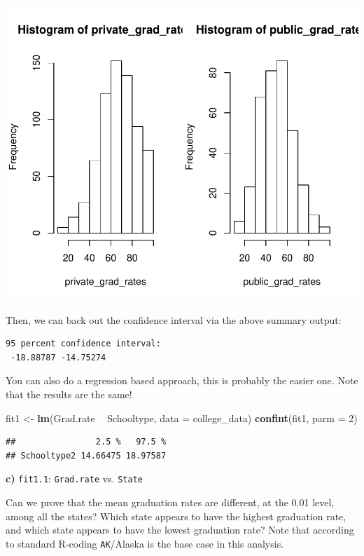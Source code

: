 \documentclass[]{article}
\newenvironment{Shaded}{\begin{snugshade}}{\end{snugshade}}
\newcommand{\KeywordTok}[1]{\textcolor[rgb]{0.13,0.29,0.53}{\textbf{#1}}}
\newcommand{\DataTypeTok}[1]{\textcolor[rgb]{0.13,0.29,0.53}{#1}}
\newcommand{\DecValTok}[1]{\textcolor[rgb]{0.00,0.00,0.81}{#1}}
\newcommand{\StringTok}[1]{\textcolor[rgb]{0.31,0.60,0.02}{#1}}
\newcommand{\OperatorTok}[1]{\textcolor[rgb]{0.81,0.36,0.00}{\textbf{#1}}}
\newcommand{\NormalTok}[1]{#1}
\begin{document}
\begin{flushleft}\includegraphics{Midterm_11_01_2016_Answers_files/figure-latex/unnamed-chunk-14-1} \end{flushleft}

Then, we can back out the confidence interval via the above summary
output:

\begin{verbatim}
95 percent confidence interval:
 -18.88787 -14.75274
\end{verbatim}

You can also do a regression based approach, this is probably the easier
one. Note that the results are the same!

\begin{Shaded}
\begin{Highlighting}[]
\NormalTok{fit1 <-}\StringTok{ }\KeywordTok{lm}\NormalTok{(Grad.rate }\OperatorTok{~}\StringTok{ }\NormalTok{Schooltype, }\DataTypeTok{data =}\NormalTok{ college_data)}
\KeywordTok{confint}\NormalTok{(fit1, }\DataTypeTok{parm =} \DecValTok{2}\NormalTok{)}
\end{Highlighting}
\end{Shaded}

\begin{verbatim}
##                2.5 %   97.5 %
## Schooltype2 14.66475 18.97587
\end{verbatim}

\textbf{c)} \texttt{fit1.1}: \texttt{Grad.rate} vs. \texttt{State}

Can we prove that the mean graduation rates are different, at the 0.01
level, among all the states? Which state appears to have the highest
graduation rate, and which state appears to have the lowest graduation
rate? Note that according to standard R-coding \texttt{AK}/Alaska is the
base case in this analysis.
\end{document}
